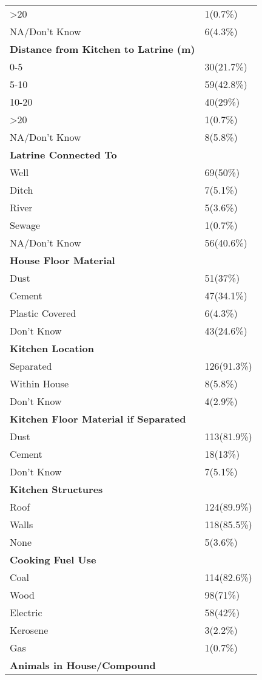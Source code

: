 \documentclass[10pt,letterpaper]{article}
\begin{document}
\begin{longtable}{ll}
\textgreater 20 & 1(0.7\%) \\
NA/Don't Know & 6(4.3\%) \\
\midrule
\textbf{Distance from Kitchen to Latrine (m)} & \\
0-5 & 30(21.7\%) \\
5-10 & 59(42.8\%) \\
10-20 & 40(29\%) \\
\textgreater 20 & 1(0.7\%) \\
NA/Don't Know & 8(5.8\%) \\
\midrule
\textbf{Latrine Connected To} & \\
Well & 69(50\%) \\
Ditch & 7(5.1\%) \\
River & 5(3.6\%) \\
Sewage & 1(0.7\%) \\
NA/Don't Know & 56(40.6\%) \\
\midrule
\textbf{House Floor Material} & \\
Dust & 51(37\%) \\
Cement & 47(34.1\%) \\
Plastic Covered & 6(4.3\%) \\
Don't Know & 43(24.6\%) \\
\midrule
\textbf{Kitchen Location} & \\
Separated & 126(91.3\%) \\
Within House & 8(5.8\%) \\
Don't Know & 4(2.9\%) \\
\midrule
\textbf{Kitchen Floor Material if Separated} & \\
Dust & 113(81.9\%) \\
Cement & 18(13\%) \\
Don't Know & 7(5.1\%) \\
\midrule
\textbf{Kitchen Structures} & \\
Roof & 124(89.9\%) \\
Walls & 118(85.5\%) \\
None & 5(3.6\%) \\
\midrule
\textbf{Cooking Fuel Use} & \\
Coal & 114(82.6\%) \\
Wood & 98(71\%) \\
Electric & 58(42\%) \\
Kerosene & 3(2.2\%) \\
Gas & 1(0.7\%) \\
\midrule
\textbf{Animals in House/Compound} & \\

\end{longtable}
\end{document}
